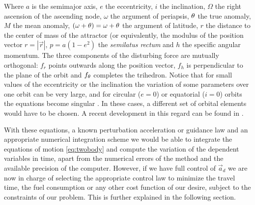 Where $a$ is the semimajor axis, $e$ the eccentricity, $i$ the inclination, $\Omega$ the right ascension of the ascending node, $\omega$ the argument of periapsis, $\theta$ the true anomaly, $M$ the mean anomaly, $(\omega + \theta) = \omega + \theta$ the argument of latitude, $r$ the distance to the center of mass of the attractor (or equivalently, the modulus of the position vector $r = |\vec{r}|$, $p = a (1 - e^2)$ the \textit{semilatus rectum} and $h$ the specific angular momentum. The three components of the disturbing force are mutually orthogonal: $f_r$ points outwards along the position vector, $f_h$ is perpendicular to the plane of the orbit and $f_{\theta}$ completes the trihedron.
% 
% 
%
%
% 
% 
%
%
Notice that for small values of the eccentricity or the inclination the variation of some parameters over one orbit can be very large, and for circular ($e = 0$) or equatorial ($i = 0$) orbits the equations become singular \cite{vallado2001fundamentals}. In these cases, a different set of orbital elements would have to be chosen. A recent development in this regard can be found in \cite{bau2013new}.
% 
% 

With these equations, a known perturbation acceleration or guidance law and an appropriate numerical integration scheme we would be able to integrate the equations of motion \ref{eq:twobody} and compute the variation of the dependent variables in time, apart from the numerical errors of the method and the available precision of the computer. However, if we have full control of $\vec{a}_d$ we are now in charge of selecting the appropriate control law to minimize the travel time, the fuel consumption or any other cost function of our desire, subject to the constraints of our problem. This is further explained in the following section.
% 
% 
% 
% 

